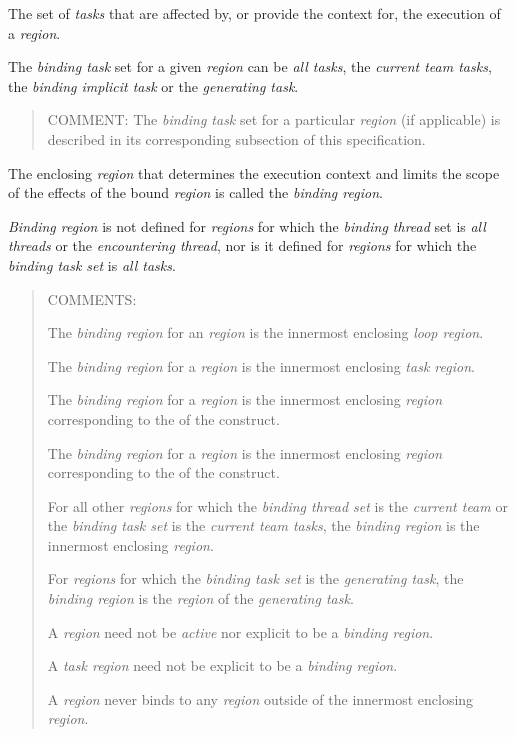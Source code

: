 \glossarydefstart
The set of \emph{tasks} that are affected by, or provide the context for, the execution of a
\emph{region}.

The \emph{binding task} set for a given \emph{region} can be \emph{all tasks},
the \emph{current team tasks}, the \emph{binding implicit task} or the \emph{generating task}.

\begin{quote}
COMMENT: The \emph{binding task} set for a particular \emph{region} (if applicable) is
described in its corresponding subsection of this specification.
\end{quote}
\glossarydefend

{}
\glossarydefstart
The enclosing \emph{region} that determines the execution context and limits the scope of
the effects of the bound \emph{region} is called the \emph{binding region}.

\emph{Binding region} is not defined for \emph{regions} for which the \emph{binding thread} set is \emph{all threads}
or the \emph{encountering thread}, nor is it defined for \emph{regions} for which the \emph{binding task set} is
\emph{all tasks}.

\begin{quote}
COMMENTS:

The \emph{binding region} for an  \emph{region} is the innermost enclosing
\emph{loop region}.

The \emph{binding region} for a  \emph{region} is the innermost enclosing
\emph{task region}.

The \emph{binding region} for a  \emph{region} is the innermost enclosing \emph{region} corresponding to the  of the  construct.

The \emph{binding region} for a  \emph{region} is the innermost enclosing \emph{region} corresponding to the  of the  construct.

For all other \emph{regions} for which the \emph{binding thread set} is the \emph{current
team} or the \emph{binding task set} is the \emph{current team tasks}, the \emph{binding
region} is the innermost enclosing  \emph{region}.

For \emph{regions} for which the \emph{binding task set} is the \emph{generating task}, the
\emph{binding region} is the \emph{region} of the \emph{generating task}.

A  \emph{region} need not be \emph{active} nor explicit to be a \emph{binding region}.

A \emph{task region} need not be explicit to be a \emph{binding region}.

A \emph{region} never binds to any \emph{region} outside of the innermost enclosing
 \emph{region}.
\end{quote}
\glossarydefend

